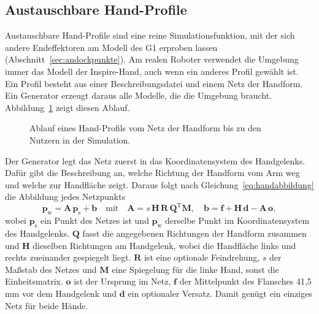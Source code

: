 \subsection{Austauschbare Hand-Profile}
\label{sec:hand_profile}
Austauschbare Hand-Profile sind eine reine Simulationsfunktion, mit der sich andere Endeffektoren am Modell des G1 erproben lassen (Abschnitt~\ref{sec:andockpunkte}).
Am realen Roboter verwendet die Umgebung immer das Modell der Inspire-Hand, auch wenn ein anderes Profil gewählt ist.
Ein Profil besteht aus einer Beschreibungsdatei und einem Netz der Handform. Ein Generator erzeugt daraus alle Modelle, die die Umgebung braucht.
Abbildung~\ref{fig:handprofil} zeigt diesen Ablauf.

\begin{figure}[htbp]
  \centering
  
  \caption[Ablauf eines Hand-Profils]{Ablauf eines Hand-Profils vom Netz der Handform bis zu den Nutzern in der Simulation.}
  \label{fig:handprofil}
\end{figure}

Der Generator legt das Netz zuerst in das Koordinatensystem des Handgelenks.
Dafür gibt die Beschreibung an, welche Richtung der Handform vom Arm weg und welche zur Handfläche zeigt.
Daraus folgt nach Gleichung~\ref{eq:handabbildung} die Abbildung jedes Netzpunkts
\begin{equation}
  \mathbf{p}_\mathrm{w} = \mathbf{A}\,\mathbf{p}_\mathrm{s} + \mathbf{b}
  \quad\mathrm{mit}\quad
  \mathbf{A} = s\,\mathbf{H}\,\mathbf{R}\,\mathbf{Q}^\mathrm{T}\mathbf{M} ,
  \quad
  \mathbf{b} = \mathbf{f} + \mathbf{H}\,\mathbf{d} - \mathbf{A}\,\mathbf{o} ,
  \label{eq:handabbildung}
\end{equation}
%
wobei $\mathbf{p}_\mathrm{s}$ ein Punkt des Netzes ist und $\mathbf{p}_\mathrm{w}$ derselbe Punkt im Koordinatensystem des Handgelenks.
$\mathbf{Q}$ fasst die angegebenen Richtungen der Handform zusammen und $\mathbf{H}$ dieselben Richtungen am Handgelenk, wobei die Handfläche links und rechts zueinander gespiegelt liegt.
$\mathbf{R}$ ist eine optionale Feindrehung, $s$ der Maßstab des Netzes und $\mathbf{M}$ eine Spiegelung für die linke Hand, sonst die Einheitsmatrix.
$\mathbf{o}$ ist der Ursprung im Netz, $\mathbf{f}$ der Mittelpunkt des Flansches 41,5\,mm vor dem Handgelenk und $\mathbf{d}$ ein optionaler Versatz.
Damit genügt ein einziges Netz für beide Hände.

